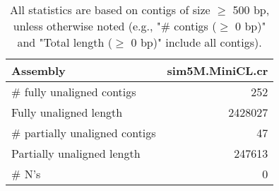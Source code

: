 \documentclass[12pt,a4paper]{article}
\begin{document}
\begin{table}[ht]
\begin{center}
\caption{All statistics are based on contigs of size $\geq$ 500 bp, unless otherwise noted (e.g., "\# contigs ($\geq$ 0 bp)" and "Total length ($\geq$ 0 bp)" include all contigs).}
\begin{tabular}{|l*{1}{|r}|}
\hline
Assembly & sim5M.MiniCL.cr \\ \hline
\# fully unaligned contigs & 252 \\ \hline
Fully unaligned length & 2428027 \\ \hline
\# partially unaligned contigs & 47 \\ \hline
Partially unaligned length & 247613 \\ \hline
\# N's & 0 \\ \hline
\end{tabular}
\end{center}
\end{table}
\end{document}
